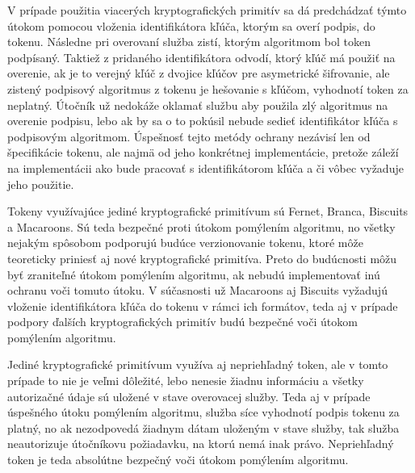 V prípade použitia viacerých kryptografických primitív sa dá predchádzať týmto útokom pomocou vloženia identifikátora kľúča, ktorým sa overí podpis, do tokenu. Následne pri overovaní služba zistí, ktorým algoritmom bol token podpísaný. Taktiež z pridaného identifikátora odvodí, ktorý kľúč má použiť na overenie, ak je to verejný kľúč z dvojice kľúčov pre asymetrické šifrovanie, ale zistený podpisový algoritmus z tokenu je hešovanie s kľúčom, vyhodnotí token za neplatný. Útočník už nedokáže oklamať službu aby použila zlý algoritmus na overenie podpisu, lebo ak by sa o to pokúsil nebude sedieť identifikátor kľúča s podpisovým algoritmom. Úspešnosť tejto metódy ochrany nezávisí len od špecifikácie tokenu, ale najmä od jeho konkrétnej implementácie, pretože záleží na implementácii ako bude pracovať s identifikátorom kľúča a či vôbec vyžaduje jeho použitie.

Tokeny využívajúce jediné kryptografické primitívum sú Fernet, Branca, Biscuits a Macaroons. Sú teda bezpečné proti útokom pomýlením algoritmu, no všetky nejakým spôsobom podporujú budúce verzionovanie tokenu, ktoré môže teoreticky priniesť aj nové kryptografické primitíva. Preto do budúcnosti môžu byť zraniteľné útokom pomýlením algoritmu, ak nebudú implementovať inú ochranu voči tomuto útoku. V súčasnosti už Macaroons aj Biscuits vyžadujú vloženie identifikátora kľúča do tokenu v rámci ich formátov, teda aj v prípade podpory ďalších kryptografických primitív budú bezpečné voči útokom pomýlením algoritmu.

Jediné kryptografické primitívum využíva aj nepriehľadný token, ale v tomto prípade to nie je veľmi dôležité, lebo nenesie žiadnu informáciu a všetky autorizačné údaje sú uložené v stave overovacej služby. Teda aj v prípade úspešného útoku pomýlením algoritmu, služba síce vyhodnotí podpis tokenu za platný, no ak nezodpovedá žiadnym dátam uloženým v stave služby, tak služba neautorizuje útočníkovu požiadavku, na ktorú nemá inak právo. Nepriehľadný token je teda absolútne bezpečný voči útokom pomýlením algoritmu.

